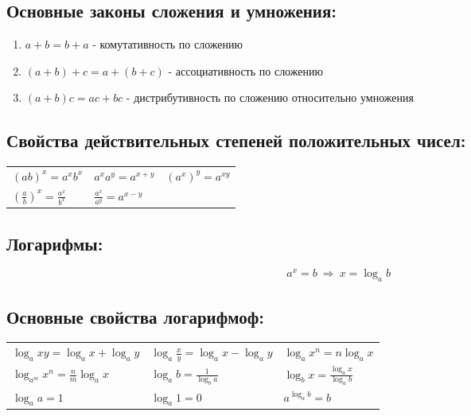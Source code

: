 \documentclass[12pt, a6paper]{extarticle}
\begin{document}
\subsection{Основные законы сложения и умножения:}
\begin{enumerate}
	\item $a+b=b+a$ - комутативность по сложению
	\item $(a+b)+c=a+(b+c)$ - ассоциативность по сложению
	\item $(a+b)c=ac+bc$ - дистрибутивность по сложению относительно умножения
\end{enumerate}
\subsection{Свойства действительных степеней положительных чисел:}
\begin{tabular}{p{5cm}p{5cm}p{5cm}}
	$\displaystyle \left( a b \right)^x = a^xb^x$ &
	$\displaystyle a^xa^y = a^{x+y}             $ &
	$\displaystyle \left( a^x \right)^y = a^{xy}$ \\
	$\displaystyle \left( \frac{a}{b} \right)^x = \frac{a^x}{b^x}$ &
	$\displaystyle \frac{a^x}{a^y} = a^{x-y}                     $ & \\
\end{tabular}
\subsection{Логарифмы:}
$$a^x=b \ \Rightarrow \  x = \log_ab \ \ \ \ \ \ \ \  $$
\subsection{Основные свойства логарифмоф:}
\begin{tabular}{p{5cm}p{5cm}p{5cm}}
	$\displaystyle \log_axy = \log_ax+\log_ay$ & 
	$\displaystyle \log_a \frac{x}{y} = \log_ax-\log_ay$ &
	$\displaystyle \log_ax^n = n\log_ax$ \\
	$\displaystyle \log_{a^m}x^n = \frac{n}{m}\log_ax$ &
	$\displaystyle \log_ab = \frac{1}{\log_ba}$ &
	$\displaystyle \log_bx = \frac{\log_ax}{\log_ab}$ \\
	$\log_aa=1$ & $\log_a1=0$ & $\displaystyle a^{\log_ab}=b$ \\
\end{tabular}
\newpage
\end{document}
